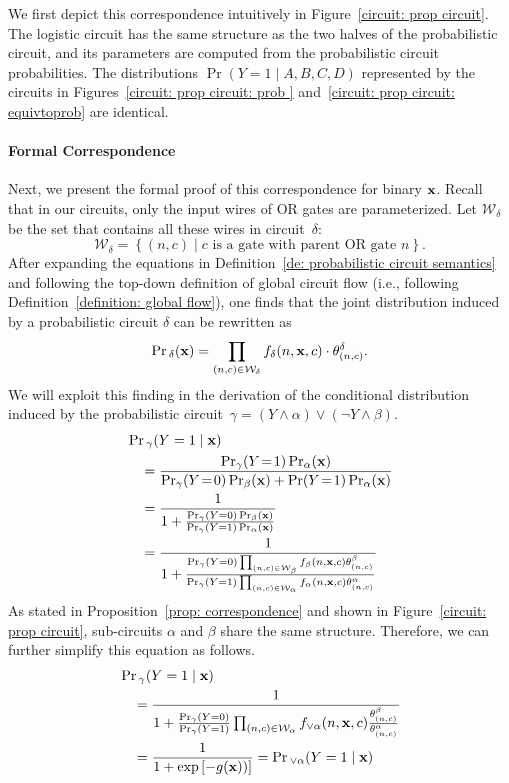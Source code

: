 \documentclass[letterpaper]{article} %
\newcommand{\sample}{{\bf x}}
\begin{document}
We first depict this correspondence intuitively in Figure~\ref{circuit: prop circuit}. The logistic circuit has the same structure as the two halves of the probabilistic circuit, and its parameters are computed from the probabilistic circuit probabilities. The distributions $\Pr(Y=1 \mid A,B,C,D)$ represented by the circuits in Figures~\ref{circuit: prop circuit: prob } and~\ref{circuit: prop circuit: equivtoprob} are identical.

\paragraph{Formal Correspondence}
Next, we present the formal proof of this correspondence for binary $\sample$.
Recall that in our circuits, only the input wires of OR gates are parameterized. Let $\mathcal{W}_\delta$ be the set that contains all these wires in circuit~$\delta$: $$\mathcal{W}_\delta = \left\{(n, c) \mid c\text{ is a gate with parent OR gate } n \right\}.$$
After expanding the equations in Definition~\ref{de: probabilistic circuit semantics} and following the top-down definition of global circuit flow (i.e., following Definition~\ref{definition: global flow}), one finds that the joint distribution induced by a probabilistic circuit $\delta$ can be rewritten as
$$
\Pr{_\delta}(\sample) = \prod_{(n, c) \in \mathcal{W}_\delta} f_\delta(n,\sample,c) \cdot \theta_{(n,c)}^\delta.
$$
We will exploit this finding in the derivation of the conditional distribution induced by the probabilistic circuit~$\gamma = (Y \land \alpha) \lor (\neg Y \land \beta)$.
\begin{align}
&\Pr{_{\gamma}}(Y=1 \mid \sample) \nonumber \\
&\quad =\frac{\Pr_\gamma(Y\!=\!1)\Pr_\alpha(\sample)}{\Pr_\gamma(Y\!=\!0)\Pr_\beta(\sample) + \Pr(Y\!=\!1)\Pr_\alpha(\sample)} \nonumber\\
&\quad = \frac{1}{1+\frac{\Pr_{\gamma}(Y=0)\Pr_\beta(\sample)}{\Pr_{\gamma}(Y=1)\Pr_\alpha(\sample)}} \nonumber \\
&\quad =\frac{1}{1+\frac{\Pr_{\gamma}(Y=0)\prod_{(n,c) \in \mathcal{W}_\beta} f_\beta(n,\sample,c)\theta_{(n,c)}^\beta}{\Pr_{\gamma}(Y=1)\prod_{(n,c) \in \mathcal{W}_\alpha} f_\alpha(n,\sample,c)\theta^\alpha_{(n,c)}}} \nonumber
\end{align}
As stated in Proposition~\ref{prop: correspondence} and shown in Figure~\ref{circuit: prop circuit}, sub-circuits $\alpha$ and $\beta$ share the same structure. Therefore, we can further simplify this equation as follows.
\begin{align}
&\Pr{_{\gamma}}(Y=1 \mid \sample) \nonumber \\
&\quad = \frac{1}{1+\frac{\Pr_{\gamma}(Y=0)}{\Pr_{\gamma}(Y=1)}\prod_{(n,c) \in \mathcal{W}_{\alpha} } f_{\lor \alpha}(n, \sample, c) \frac{\theta^\beta_{(n,c)}}{\theta^\alpha_{(n,c)}} }  \nonumber
\\
&\quad = \frac{1}{1+\exp\left[- g(\sample)) \right]} = \Pr{_{\lor \alpha}}(Y=1 \mid \sample) \nonumber
\end{align}
\end{document}
